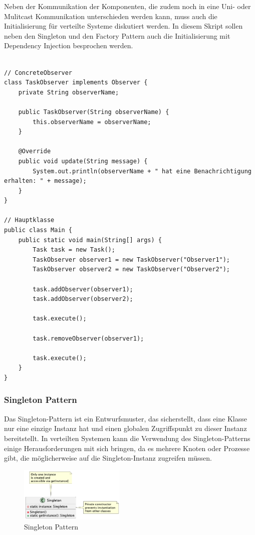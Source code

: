 Neben der Kommunikation der Komponenten, die zudem noch in eine Uni- oder Mulitcast Kommunikation unterschieden werden kann, muss auch die Initialisierung für verteilte Systeme diskutiert werden. In diesem Skript sollen neben den Singleton und den Factory Pattern auch die Initialisierung mit Dependency Injection besprochen werden.\\\\
\noindent\begin{minipage}{\textwidth}
\begin{lstlisting}[caption={Observer Pattern - Concrete Observer},captionpos=b,label={lst:observer-II}]
// ConcreteObserver
class TaskObserver implements Observer {
    private String observerName;

    public TaskObserver(String observerName) {
        this.observerName = observerName;
    }

    @Override
    public void update(String message) {
        System.out.println(observerName + " hat eine Benachrichtigung erhalten: " + message);
    }
}

// Hauptklasse
public class Main {
    public static void main(String[] args) {
        Task task = new Task();
        TaskObserver observer1 = new TaskObserver("Observer1");
        TaskObserver observer2 = new TaskObserver("Observer2");

        task.addObserver(observer1);
        task.addObserver(observer2);

        task.execute();

        task.removeObserver(observer1);

        task.execute();
    }
}
\end{lstlisting}
\end{minipage}

\subsubsection{Singleton Pattern}

Das Singleton-Pattern ist ein Entwurfsmuster, das sicherstellt, dass eine Klasse nur eine einzige Instanz hat und einen globalen Zugriffspunkt zu dieser Instanz bereitstellt. In verteilten Systemen kann die Verwendung des Singleton-Patterns einige Herausforderungen mit sich bringen, da es mehrere Knoten oder Prozesse gibt, die möglicherweise auf die Singleton-Instanz zugreifen müssen.
\begin{figure}[!ht]
  \centering
  \includegraphics[width=0.45\textwidth]{fig/uml/singleton.png}
  \caption{Singleton Pattern}
  \label{fig:singleton}
\end{figure}

